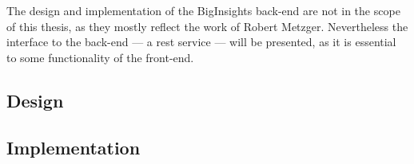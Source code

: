 The design and implementation of the BigInsights back-end are not in the scope of this thesis, as they mostly reflect the work of Robert Metzger. Nevertheless the interface to the back-end --- a \ac{rest} service --- will be presented, as it is essential to some functionality of the front-end.
\subsection{Design}
\subsection{Implementation}